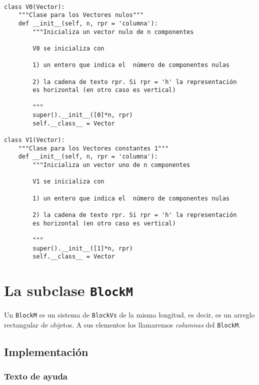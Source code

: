\documentclass[11pt]{report}
\begin{document}
\begin{verbatim}

class V0(Vector):
    """Clase para los Vectores nulos"""
    def __init__(self, n, rpr = 'columna'):
        """Inicializa un vector nulo de n componentes

        V0 se inicializa con

        1) un entero que indica el  número de componentes nulas
    
        2) la cadena de texto rpr. Si rpr = 'h' la representación
        es horizontal (en otro caso es vertical)

        """
        super().__init__([0]*n, rpr)
        self.__class__ = Vector

class V1(Vector):
    """Clase para los Vectores constantes 1"""
    def __init__(self, n, rpr = 'columna'):
        """Inicializa un vector uno de n componentes

        V1 se inicializa con

        1) un entero que indica el  número de componentes nulas
    
        2) la cadena de texto rpr. Si rpr = 'h' la representación
        es horizontal (en otro caso es vertical)

        """
        super().__init__([1]*n, rpr)
        self.__class__ = Vector

\end{verbatim}


\chapter{La subclase \texttt{BlockM}}
\label{sec:org8c9a9e4}

Un \texttt{BlockM} es un sistema de \texttt{BlockVs} de la misma longitud, es decir,
es un arreglo rectangular de objetos. A sus elementos los llamaremos
\emph{columnas} del \texttt{BlockM}.

\section{Implementación}
\label{sec:org3073033}
\subsection{Texto de ayuda}
\label{sec:orge8c33ce}
\end{document}
